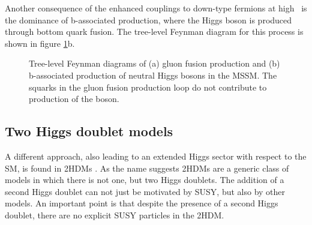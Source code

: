 Another consequence of the enhanced couplings to down-type fermions at high \tanb~is the dominance of b-associated production, where the Higgs boson is produced through
bottom quark fusion. The tree-level Feynman diagram for this process is shown in figure \ref{fig:production_mssm}b.

\begin{figure}[h!]
\begin{center}
\end{center}
\caption[Tree-level Feynman diagrams of gluon fusion and b-associated production of neutral Higgs bosons in the MSSM]{Tree-level Feynman diagrams of (a) gluon fusion production and (b) b-associated
production of neutral Higgs bosons in the MSSM. The squarks in the gluon fusion production loop do not contribute to production of the \PHiggsps boson.}
\label{fig:production_mssm}
\end{figure}

\subsection{Two Higgs doublet models}
\label{sec:theory_2HDM}
A different approach, also leading to an extended Higgs sector with
respect to the \ac{SM}, is found in \acp{2HDM} \cite{2HDM-I,2HDM-II}.
As the name suggests \acp{2HDM} are a generic class of models in which
there is not one, but two Higgs doublets. The addition of a second
Higgs doublet can not just be motivated by \ac{SUSY}, but also by other models.
An important point is that despite the presence of a second 
Higgs doublet, there are no explicit \ac{SUSY} particles in the \ac{2HDM}.


